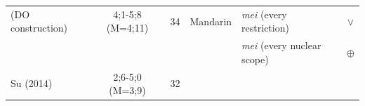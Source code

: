 \documentclass[oneside]{report}
\theoremstyle{definition}
\theoremstyle{definition}
\theoremstyle{definition}
\theoremstyle{remark}
\begin{document}
\begin{longtable}[]{@{}lccclc@{}}
\begin{minipage}[t]{0.23\columnwidth}\raggedright\strut
(DO construction)\strut
\end{minipage} & \begin{minipage}[t]{0.07\columnwidth}\centering\strut
4;1-5;8 (M=4;11)\strut
\end{minipage} & \begin{minipage}[t]{0.05\columnwidth}\centering\strut
34\strut
\end{minipage} & \begin{minipage}[t]{0.10\columnwidth}\centering\strut
Mandarin\strut
\end{minipage} & \begin{minipage}[t]{0.25\columnwidth}\raggedright\strut
\emph{mei} (every restriction)\strut
\end{minipage} & \begin{minipage}[t]{0.13\columnwidth}\centering\strut
\(\lor\)\strut
\end{minipage}\tabularnewline
\begin{minipage}[t]{0.23\columnwidth}\raggedright\strut
\strut
\end{minipage} & \begin{minipage}[t]{0.07\columnwidth}\centering\strut
\strut
\end{minipage} & \begin{minipage}[t]{0.05\columnwidth}\centering\strut
\strut
\end{minipage} & \begin{minipage}[t]{0.10\columnwidth}\centering\strut
\strut
\end{minipage} & \begin{minipage}[t]{0.25\columnwidth}\raggedright\strut
\emph{mei} (every nuclear scope)\strut
\end{minipage} & \begin{minipage}[t]{0.13\columnwidth}\centering\strut
\(\oplus\)\strut
\end{minipage}\tabularnewline
\begin{minipage}[t]{0.23\columnwidth}\raggedright\strut
Su (2014)\strut
\end{minipage} & \begin{minipage}[t]{0.07\columnwidth}\centering\strut
2;6-5;0 (M=3;9)\strut
\end{minipage} & \begin{minipage}[t]{0.05\columnwidth}\centering\strut
32\strut
\end{minipage} & \begin{minipage}[t]{0.10\columnwidth}\centering\strut

\end{minipage}
\end{longtable}
\end{document}
